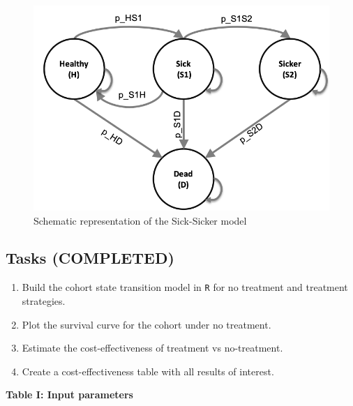 \documentclass[]{article}
\begin{document}
\begin{figure}

{\centering \includegraphics[width=1\linewidth]{sick_sicker_diagram} 

}

\caption{Schematic representation of the Sick-Sicker model}\label{fig:unnamed-chunk-1}
\end{figure}

\subsection{Tasks (COMPLETED)}\label{tasks-completed}

\begin{enumerate}
\def\labelenumi{\arabic{enumi}.}
\item
  Build the cohort state transition model in \texttt{R} for no treatment
  and treatment strategies.
\item
  Plot the survival curve for the cohort under no treatment.
\item
  Estimate the cost-effectiveness of treatment vs no-treatment.
\item
  Create a cost-effectiveness table with all results of interest.
\end{enumerate}

\textbf{Table I: Input parameters}
\end{document}
